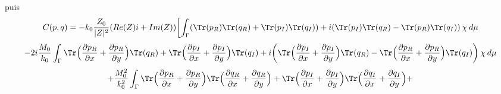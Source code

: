 \newpage
puis
\[
C(p,q) = -k_0\frac{Z_0}{|Z|^2}(Re(Z)i + Im(Z)) \biggl[ \int_{\Gamma} ( \Tr(p_R) \Tr(q_R) + \Tr(p_I) \Tr(q_I)) + i( \Tr(p_I) \Tr(q_R) - \Tr(p_R) \Tr(q_I)) \hspace{2pt} \chi \hspace{2pt} d\mu \]
\[
- 2i\frac{M_0}{k_0} \int_{\Gamma} \Tr \Bigl( \frac{\partial p_R}{\partial x}+\frac{\partial p_R}{\partial y} \Bigr) \Tr(q_R) + \Tr \Bigl( \frac{\partial p_I}{\partial x}+\frac{\partial p_I}{\partial y} \Bigr) \Tr(q_I) +i\biggl(  \Tr \Bigl( \frac{\partial p_I}{\partial x}+\frac{\partial p_I}{\partial y} \Bigr) \Tr(q_R) - \Tr \Bigl( \frac{\partial p_R}{\partial x}+\frac{\partial p_R}{\partial y} \Bigr) \Tr(q_I) \biggl)\hspace{2pt} \chi \hspace{2pt} d\mu 
\]
\[
+ \frac{M_0^2}{k_0^2}\int_{\Gamma} \Tr \Bigl( \frac{\partial p_R}{\partial x}+\frac{\partial p_R}{\partial y}\Bigr)\Tr\Bigl( \frac{\partial q_R}{\partial x}+\frac{\partial q_R}{\partial y}\Bigr) + \Tr \Bigl( \frac{\partial p_I}{\partial x}+\frac{\partial p_I}{\partial y}\Bigr)\Tr\Bigl( \frac{\partial q_I}{\partial x}+\frac{\partial q_I}{\partial y}\Bigr) + \]

